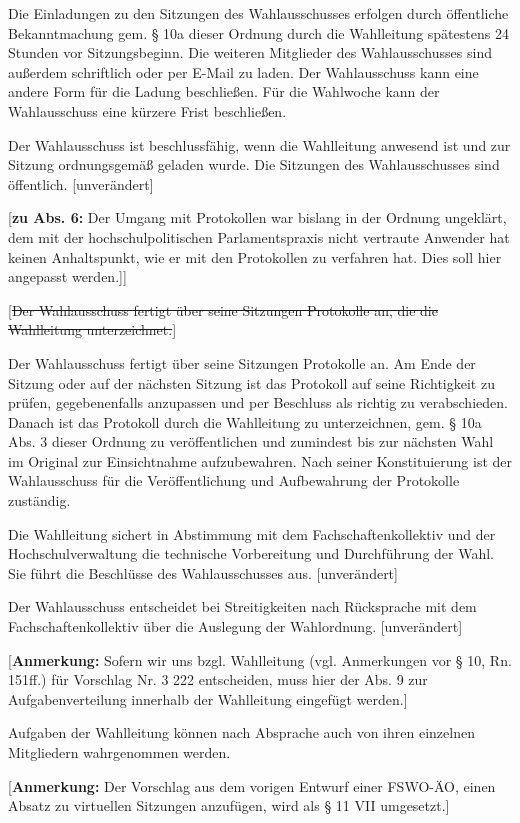 \documentclass[%
draft,%
multilinesections%
]{fswo}
\newcommand\oldT[1] {{\color{Gray}[\st{#1}]}}
\newcommand\bemFr[1]{{\color{Red}[#1]}}
\newcommand\oldT[1]{}%
\newcommand\bemFr[1]{}%
\begin{document}
\begin{contract}
Die Einladungen zu den Sitzungen des Wahlausschusses erfolgen  durch öffentliche Bekanntmachung gem. § 10a dieser Ordnung durch die Wahlleitung spätestens 24 Stunden vor Sitzungsbeginn.
Die weiteren Mitglieder des Wahlausschusses sind außerdem schriftlich oder per E-Mail zu laden.
Der Wahlausschuss kann eine andere Form für die Ladung beschließen.
Für die Wahlwoche kann der Wahlausschuss eine kürzere Frist beschließen.

Der Wahlausschuss ist beschlussfähig, wenn die Wahlleitung anwesend ist und zur Sitzung ordnungsgemäß geladen wurde.
Die Sitzungen des Wahlausschusses sind öffentlich.
\bemFr{unverändert}
%
\begin{addmargin}{1cm}
\bemFr{\textbf{zu Abs. 6:}
Der Umgang mit Protokollen war bislang in der Ordnung ungeklärt,
dem mit der hochschulpolitischen Parlamentspraxis nicht vertraute Anwender hat keinen Anhaltspunkt,
wie er mit den Protokollen zu verfahren hat.
Dies soll hier angepasst werden.]}
\end{addmargin}
%
\oldT{Der Wahlausschuss fertigt über seine Sitzungen Protokolle an, die die Wahlleitung unterzeichnet.}

Der Wahlausschuss fertigt über seine Sitzungen Protokolle an.
Am Ende der Sitzung oder auf der nächsten Sitzung ist das Protokoll auf seine Richtigkeit zu prüfen, gegebenenfalls anzupassen und per Beschluss als richtig zu verabschieden.
Danach ist das Protokoll durch die Wahlleitung zu unterzeichnen, gem. § 10a Abs. 3 dieser Ordnung zu veröffentlichen und zumindest bis zur nächsten Wahl im Original zur Einsichtnahme aufzubewahren.
Nach seiner Konstituierung ist der Wahlausschuss für die Veröffentlichung und Aufbewahrung der Protokolle zuständig.

Die Wahlleitung sichert in Abstimmung mit dem Fachschaftenkollektiv und der Hochschulverwaltung die technische Vorbereitung und Durchführung der Wahl.
Sie führt die Beschlüsse des Wahlausschusses aus.
\bemFr{unverändert}

Der Wahlausschuss entscheidet bei Streitigkeiten nach Rücksprache mit dem Fachschaftenkollektiv über die Auslegung der Wahlordnung.
\bemFr{unverändert}
%
\begin{addmargin}{1cm}
\bemFr{\textbf{Anmerkung:} Sofern wir uns bzgl. Wahlleitung (vgl. Anmerkungen vor § 10, Rn. 151ff.) für Vorschlag Nr. 3
222 entscheiden, muss hier der Abs. 9 zur Aufgabenverteilung innerhalb der Wahlleitung eingefügt werden.}
\end{addmargin}

Aufgaben der Wahlleitung können nach Absprache auch von ihren einzelnen Mitgliedern wahrgenommen werden.
%
\begin{addmargin}{1cm}
\bemFr{\textbf{Anmerkung:} Der Vorschlag aus dem vorigen Entwurf einer FSWO-ÄO, einen Absatz zu virtuellen Sitzungen anzufügen, wird als § 11 VII umgesetzt.}
\end{addmargin}
\end{contract}
\end{document}
